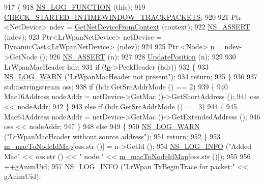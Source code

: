 \begin{DoxyCode}
917 \{
918   \hyperlink{log-macros-disabled_8h_a90b90d5bad1f39cb1b64923ea94c0761}{NS\_LOG\_FUNCTION} (\textcolor{keyword}{this});
919   \hyperlink{animation-interface_8h_acdf351a3155a6ccf1813189e10dba8f5}{CHECK\_STARTED\_INTIMEWINDOW\_TRACKPACKETS};
920 
921   Ptr <NetDevice> ndev = \hyperlink{classns3_1_1AnimationInterface_a5054e94f0c5e3d0a4443cfbe52e2ea30}{GetNetDeviceFromContext} (context);
922   \hyperlink{assert_8h_a6dccdb0de9b252f60088ce281c49d052}{NS\_ASSERT} (ndev);
923   Ptr<LrWpanNetDevice> netDevice = DynamicCast<LrWpanNetDevice> (ndev);
924 
925   Ptr <Node> \hyperlink{namespacesample-rng-plot_aeb5ee5c431e338ef39b7ac5431242e1d}{n} = ndev->GetNode ();
926   \hyperlink{assert_8h_a6dccdb0de9b252f60088ce281c49d052}{NS\_ASSERT} (n);
927 
928   \hyperlink{classns3_1_1AnimationInterface_ab751cf6f459289f0978f4bb97b93044d}{UpdatePosition} (n);
929 
930   LrWpanMacHeader hdr;
931   \textcolor{keywordflow}{if} (!\hyperlink{lte__link__budget_8m_ac9de518908a968428863f829398a4e62}{p}->PeekHeader (hdr))
932   \{
933     \hyperlink{group__logging_gade7208b4009cdf0e25783cd26766f559}{NS\_LOG\_WARN} (\textcolor{stringliteral}{"LrWpanMacHeader not present"});
934     \textcolor{keywordflow}{return};
935   \}
936 
937   std::ostringstream oss;
938   \textcolor{keywordflow}{if} (hdr.GetSrcAddrMode () == 2)
939     \{
940       Mac16Address nodeAddr = netDevice->GetMac ()->GetShortAddress ();
941       oss << nodeAddr;
942     \}
943   \textcolor{keywordflow}{else} \textcolor{keywordflow}{if} (hdr.GetSrcAddrMode () == 3)
944     \{
945       Mac64Address nodeAddr = netDevice->GetMac ()->GetExtendedAddress ();
946       oss << nodeAddr;
947     \}
948   \textcolor{keywordflow}{else}
949     \{
950       \hyperlink{group__logging_gade7208b4009cdf0e25783cd26766f559}{NS\_LOG\_WARN} (\textcolor{stringliteral}{"LrWpanMacHeader without source address"});
951       \textcolor{keywordflow}{return};
952     \}
953   \hyperlink{classns3_1_1AnimationInterface_a4d47d5b16cac7965cc0fbb1c50b3a268}{m\_macToNodeIdMap}[oss.str ()] = n->GetId ();
954   \hyperlink{group__logging_gafbd73ee2cf9f26b319f49086d8e860fb}{NS\_LOG\_INFO} (\textcolor{stringliteral}{"Added Mac"} << oss.str () << \textcolor{stringliteral}{" node:"} <<
      \hyperlink{classns3_1_1AnimationInterface_a4d47d5b16cac7965cc0fbb1c50b3a268}{m\_macToNodeIdMap}[oss.str ()]);
955 
956   ++\hyperlink{classns3_1_1AnimationInterface_a98ecb4d4c024e52171b3154f09b7bcc2}{gAnimUid};
957   \hyperlink{group__logging_gafbd73ee2cf9f26b319f49086d8e860fb}{NS\_LOG\_INFO} (\textcolor{stringliteral}{"LrWpan TxBeginTrace for packet:"} << gAnimUid);

\end{DoxyCode}
